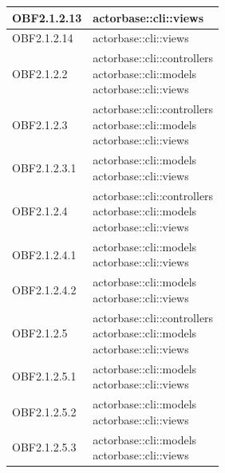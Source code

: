 \documentclass{scalatekids-article}
\begin{document}
\begin{longtable}[H]{|p{3.5cm}|p{7.5cm}|}
  \hline
  OBF2.1.2.13 & \multiLineCell[t]{actorbase::cli::views\\}\\
  \hline
  OBF2.1.2.14 & \multiLineCell[t]{actorbase::cli::views\\}\\
  \hline
  OBF2.1.2.2 & \multiLineCell[t]{actorbase::cli::controllers\\actorbase::cli::models\\actorbase::cli::views\\}\\
  \hline
  OBF2.1.2.3 & \multiLineCell[t]{actorbase::cli::controllers\\actorbase::cli::models\\actorbase::cli::views\\}\\
  \hline
  OBF2.1.2.3.1 & \multiLineCell[t]{actorbase::cli::models\\actorbase::cli::views\\}\\
  \hline
  OBF2.1.2.4 & \multiLineCell[t]{actorbase::cli::controllers\\actorbase::cli::models\\actorbase::cli::views\\}\\
  \hline
  OBF2.1.2.4.1 & \multiLineCell[t]{actorbase::cli::models\\actorbase::cli::views\\}\\
  \hline
  OBF2.1.2.4.2 & \multiLineCell[t]{actorbase::cli::models\\actorbase::cli::views\\}\\
  \hline
  OBF2.1.2.5 & \multiLineCell[t]{actorbase::cli::controllers\\actorbase::cli::models\\actorbase::cli::views\\}\\
  \hline
  OBF2.1.2.5.1 & \multiLineCell[t]{actorbase::cli::models\\actorbase::cli::views\\}\\
  \hline
  OBF2.1.2.5.2 & \multiLineCell[t]{actorbase::cli::models\\actorbase::cli::views\\}\\
  \hline
  OBF2.1.2.5.3 & \multiLineCell[t]{actorbase::cli::models\\actorbase::cli::views\\}\\

\end{longtable}
\end{document}
